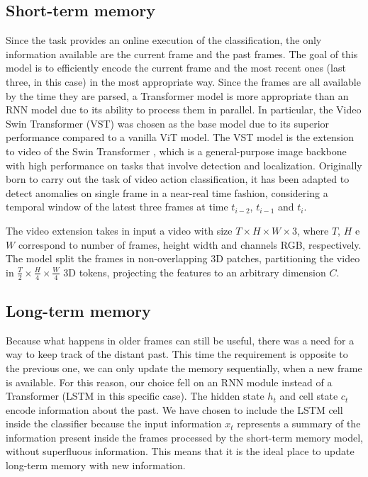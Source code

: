 \subsection{Short-term memory}

Since the task provides an online execution of the classification, the only information available are the current frame and the past frames.
The goal of this model is to efficiently encode the current frame and the most recent ones (last three, in this case) in the most appropriate way.
Since the frames are all available by the time they are parsed, a Transformer model is more appropriate than an RNN model due to its ability to process them in parallel.
In particular, the Video Swin Transformer (VST) \cite{liu_video_2022} was chosen as the base model due to its superior performance compared to a vanilla ViT \cite{DBLP:conf/iclr/DosovitskiyB0WZ21} model.
The VST model is the extension to video of the Swin Transformer \cite{liu2021Swin}, which is a general-purpose image backbone with high performance on tasks that involve detection and localization.
Originally born to carry out the task of video action classification, it has been adapted to detect anomalies on single frame in a near-real time fashion, considering a temporal window of the latest three frames at time $t_{i-2}$, $t_{i-1}$ and $t_{i}$.

The video extension takes in input a video with size $T \times H \times W \times 3$, where $T$, $H$ e $W$ correspond to number of frames, height width and channels RGB, respectively.
The model split the frames in non-overlapping 3D patches, partitioning the video in $\frac{T}{2} \times \frac{H}{4} \times \frac{W}{4}$ 3D tokens, projecting the features to an arbitrary dimension $C$.

\subsection{Long-term memory}

Because what happens in older frames can still be useful, there was a need for a way to keep track of the distant past.
This time the requirement is opposite to the previous one, we can only update the memory sequentially, when a new frame is available.
For this reason, our choice fell on an RNN module instead of a Transformer (LSTM in this specific case).
The hidden state $h_t$ and cell state $c_t$ encode information about the past.
We have chosen to include the LSTM cell inside the classifier because the input information $x_t$ represents a summary of the information present inside the frames processed by the short-term memory model, without superfluous information.
This means that it is the ideal place to update long-term memory with new information.

